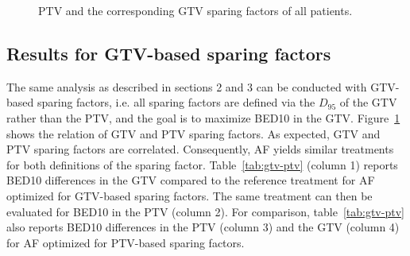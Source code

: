 \documentclass[11pt]{article}
\begin{document}
\begin{figure}[ht]
\centering
{}
\caption{PTV and the corresponding GTV sparing factors of all patients.}
\label{fig:ptv-gtv}
\end{figure}

\subsection{Results for GTV-based sparing factors}

The same analysis as described in sections 2 and 3 can be conducted with GTV-based sparing factors, i.e. all sparing factors are defined via the $D_{95}$ of the GTV rather than the PTV, and the goal is to maximize BED10 in the GTV. Figure~\ref{fig:ptv-gtv} shows the relation of GTV and PTV sparing factors. As expected, GTV and PTV sparing factors are correlated. Consequently, AF yields similar treatments for both definitions of the sparing factor. Table~\ref{tab:gtv-ptv} (column 1) reports BED10 differences in the GTV compared to the reference treatment for AF optimized for GTV-based sparing factors. The same treatment can then be evaluated for BED10 in the PTV (column 2). For comparison, table~\ref{tab:gtv-ptv} also reports BED10 differences in the PTV (column 3) and the GTV (column 4) for AF optimized for PTV-based sparing factors.
\end{document}
